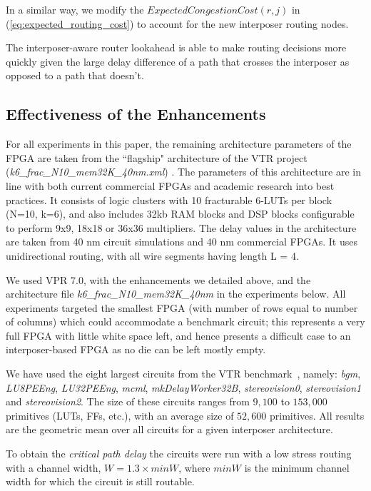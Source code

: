 \documentclass[journal]{IEEEtran}
\begin{document}
In a similar way, we modify the $ExpectedCongestionCost(r,j)$ in (\ref{eq:expected_routing_cost}) to account for the new interposer routing nodes. 

The interposer-aware router lookahead is able to make routing decisions more quickly given the large delay difference of a path that crosses the interposer as opposed to a path that doesn't.

\subsection{Effectiveness of the Enhancements}
\label{sec:CADeffect}
For all experiments in this paper, the remaining architecture parameters of the FPGA are taken from the ``flagship" architecture of the VTR project (\textit{k6\_frac\_N10\_mem32K\_40nm.xml}) \cite{luu2014vtr}. The parameters of this architecture are in line with both current commercial FPGAs and academic research into best practices. It consists of logic clusters with 10 fracturable 6-LUTs per block (N=10, k=6), and also includes 32kb RAM blocks and DSP blocks configurable to perform 9x9, 18x18 or 36x36 multipliers. The delay values in the architecture are taken from 40 nm circuit simulations and 40 nm commercial FPGAs. It uses unidirectional routing, with all wire segments having length L = 4.

We used VPR 7.0, with the enhancements we detailed above, and the architecture file \textit{k6\_frac\_N10\_mem32K\_40nm} in the experiments below. All experiments targeted the smallest FPGA (with number of rows equal to number of columns) which could accommodate a benchmark circuit; this represents a very full FPGA with little white space left, and hence presents a difficult case to an interposer-based FPGA as no die can be left mostly empty. 

We have used the eight largest circuits from the VTR benchmark~\cite{vtr2012}, namely: \textit{bgm}, \textit{LU8PEEng}, \textit{LU32PEEng}, \textit{mcml}, \textit{mkDelayWorker32B}, \textit{stereovision0}, \textit{stereovision1} and \textit{stereovision2}. The size of these circuits ranges from $9,100$ to $153,000$ primitives (LUTs, FFs, etc.), with an average size of $52,600$ primitives. All results are the geometric mean over all circuits for a given interposer architecture.

To obtain the \textit{critical path delay} the circuits were run with a low stress routing with a channel width, $W = 1.3 \times minW$, where $minW$ is the minimum channel width for which the circuit is still routable. 
\end{document}
